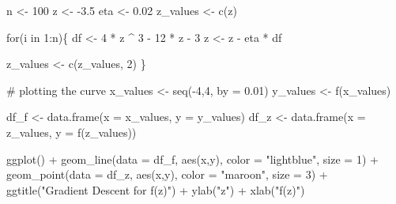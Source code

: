 \documentclass[
  letterpaper,
  DIV=11,
  numbers=noendperiod]{scrartcl}
\newenvironment{Shaded}{\begin{snugshade}}{\end{snugshade}}
\newcommand{\AttributeTok}[1]{\textcolor[rgb]{0.40,0.45,0.13}{#1}}
\newcommand{\CommentTok}[1]{\textcolor[rgb]{0.37,0.37,0.37}{#1}}
\newcommand{\ControlFlowTok}[1]{\textcolor[rgb]{0.00,0.23,0.31}{#1}}
\newcommand{\DecValTok}[1]{\textcolor[rgb]{0.68,0.00,0.00}{#1}}
\newcommand{\FloatTok}[1]{\textcolor[rgb]{0.68,0.00,0.00}{#1}}
\newcommand{\FunctionTok}[1]{\textcolor[rgb]{0.28,0.35,0.67}{#1}}
\newcommand{\NormalTok}[1]{\textcolor[rgb]{0.00,0.23,0.31}{#1}}
\newcommand{\OtherTok}[1]{\textcolor[rgb]{0.00,0.23,0.31}{#1}}
\newcommand{\SpecialCharTok}[1]{\textcolor[rgb]{0.37,0.37,0.37}{#1}}
\newcommand{\StringTok}[1]{\textcolor[rgb]{0.13,0.47,0.30}{#1}}
\begin{document}
\begin{Shaded}
\begin{Highlighting}[]
\NormalTok{n }\OtherTok{\textless{}{-}} \DecValTok{100}
\NormalTok{z }\OtherTok{\textless{}{-}} \SpecialCharTok{{-}}\FloatTok{3.5}
\NormalTok{eta }\OtherTok{\textless{}{-}} \FloatTok{0.02}
\NormalTok{z\_values }\OtherTok{\textless{}{-}} \FunctionTok{c}\NormalTok{(z)}

\ControlFlowTok{for}\NormalTok{(i }\ControlFlowTok{in} \DecValTok{1}\SpecialCharTok{:}\NormalTok{n)\{}
\NormalTok{  df }\OtherTok{\textless{}{-}} \DecValTok{4} \SpecialCharTok{*}\NormalTok{ z }\SpecialCharTok{\^{}} \DecValTok{3} \SpecialCharTok{{-}} \DecValTok{12} \SpecialCharTok{*}\NormalTok{ z }\SpecialCharTok{{-}} \DecValTok{3}
\NormalTok{  z }\OtherTok{\textless{}{-}}\NormalTok{ z }\SpecialCharTok{{-}}\NormalTok{ eta }\SpecialCharTok{*}\NormalTok{ df}
  
\NormalTok{  z\_values }\OtherTok{\textless{}{-}} \FunctionTok{c}\NormalTok{(z\_values, }\DecValTok{2}\NormalTok{)}
\NormalTok{\}}

\CommentTok{\# plotting the curve}
\NormalTok{x\_values }\OtherTok{\textless{}{-}} \FunctionTok{seq}\NormalTok{(}\SpecialCharTok{{-}}\DecValTok{4}\NormalTok{,}\DecValTok{4}\NormalTok{, }\AttributeTok{by =} \FloatTok{0.01}\NormalTok{)}
\NormalTok{y\_values }\OtherTok{\textless{}{-}} \FunctionTok{f}\NormalTok{(x\_values)}

\NormalTok{df\_f }\OtherTok{\textless{}{-}} \FunctionTok{data.frame}\NormalTok{(}\AttributeTok{x =}\NormalTok{ x\_values, }\AttributeTok{y =}\NormalTok{ y\_values)}
\NormalTok{df\_z }\OtherTok{\textless{}{-}} \FunctionTok{data.frame}\NormalTok{(}\AttributeTok{x =}\NormalTok{ z\_values, }\AttributeTok{y =} \FunctionTok{f}\NormalTok{(z\_values))}

\FunctionTok{ggplot}\NormalTok{() }\SpecialCharTok{+} 
  \FunctionTok{geom\_line}\NormalTok{(}\AttributeTok{data =}\NormalTok{ df\_f, }\FunctionTok{aes}\NormalTok{(x,y), }\AttributeTok{color =} \StringTok{"lightblue"}\NormalTok{,    }\AttributeTok{size =} \DecValTok{1}\NormalTok{) }\SpecialCharTok{+} 
  \FunctionTok{geom\_point}\NormalTok{(}\AttributeTok{data =}\NormalTok{ df\_z, }\FunctionTok{aes}\NormalTok{(x,y), }\AttributeTok{color =} \StringTok{"maroon"}\NormalTok{,      }\AttributeTok{size =} \DecValTok{3}\NormalTok{) }\SpecialCharTok{+} 
  \FunctionTok{ggtitle}\NormalTok{(}\StringTok{"Gradient Descent for f(z)"}\NormalTok{) }\SpecialCharTok{+} 
  \FunctionTok{ylab}\NormalTok{(}\StringTok{"z"}\NormalTok{) }\SpecialCharTok{+} 
  \FunctionTok{xlab}\NormalTok{(}\StringTok{"f(z)"}\NormalTok{)}
\end{Highlighting}
\end{Shaded}
\end{document}
